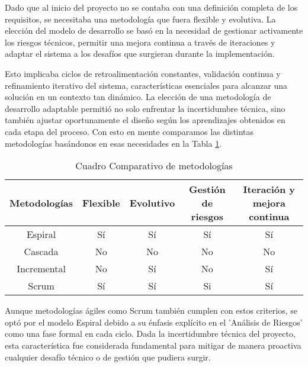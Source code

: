 
Dado que al inicio del proyecto no se contaba con una definición completa de los requisitos, se necesitaba una metodología que fuera flexible y evolutiva. La elección del modelo de desarrollo se basó en la necesidad de gestionar activamente los riesgos técnicos, permitir una mejora continua a través de iteraciones y adaptar el sistema a los desafíos que surgieran durante la implementación.

Esto implicaba ciclos de retroalimentación constantes, validación continua y refinamiento iterativo del sistema, características esenciales para alcanzar una solución en un contexto tan dinámico. La elección de una metodología de desarrollo adaptable permitió no solo enfrentar la incertidumbre técnica, sino también ajustar oportunamente el diseño según los aprendizajes obtenidos en cada etapa del proceso. Con esto en mente comparamos las distintas metodologías basándonos en esas necesidades en la Tabla \ref{tab:comparative-methodologies}.

\begin{table}[ht]
  \doublespacing
  \centering
  \small
  \begin{tabular}{ c c c c c }
    \hline
    Metodologías & Flexible & Evolutivo & Gestión de riesgos & Iteración y mejora continua \\
    \hline
    Espiral      & Sí       & Sí        & Sí                 & Sí                          \\
    Cascada      & No       & No        & No                 & No                          \\
    Incremental  & No       & Sí        & No                 & Sí                          \\
    Scrum        & Sí       & Sí        & Si                 & Sí                          \\
    \hline
  \end{tabular}
  \caption{Cuadro Comparativo de metodologías}
  \label{tab:comparative-methodologies}
\end{table}

Aunque metodologías ágiles como Scrum también cumplen con estos criterios, se optó por el modelo Espiral debido a su énfasis explícito en el 'Análisis de Riesgos' como una fase formal en cada ciclo. Dada la incertidumbre técnica del proyecto, esta característica fue considerada fundamental para mitigar de manera proactiva cualquier desafío técnico o de gestión que pudiera surgir.

